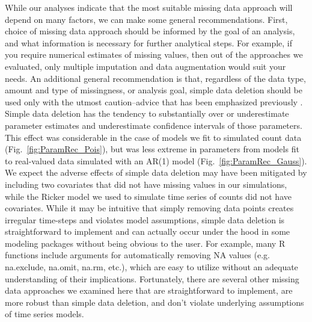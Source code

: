 \documentclass{article}
\begin{document}
While our analyses indicate that the most suitable missing data approach will depend on many factors, we can make some general recommendations. First, choice of missing data approach should be informed by the goal of an analysis, and what information is necessary for further analytical steps. For example, if you require numerical estimates of missing values, then out of the approaches we evaluated, only multiple imputation and data augmentation would suit your needs. An additional general recommendation is that, regardless of the data type, amount and type of missingness, or analysis goal, simple data deletion should be used only with the utmost caution--advice that has been emphasized previously \citep[e.g.,][]{nakagawa_model_2011, Shoari2018_mnar,lopucki2022handling}. Simple data deletion has the tendency to substantially over or underestimate parameter estimates and underestimate confidence intervals of those parameters. This effect was considerable in the case of models we fit to simulated count data (Fig.\ \ref{fig:ParamRec_Pois}), but was less extreme in parameters from models fit to real-valued data simulated with an AR(1) model (Fig.\ \ref{fig:ParamRec_Gauss}). We expect the adverse effects of simple data deletion may have been mitigated by including two covariates that did not have missing values in our simulations, while the Ricker model we used to simulate time series of counts did not have covariates. %
While it may be intuitive that simply removing data points creates irregular time-steps and violates model assumptions, simple data deletion is straightforward to implement and can actually occur under the hood in some modeling packages without being obvious to the user. For example, many R functions include arguments for automatically removing NA values (e.g. na.exclude, na.omit, na.rm, etc.), which are easy to utilize without an adequate understanding of their implications. Fortunately, there are several other missing data approaches we examined here that are straightforward to implement, are more robust than simple data deletion, and don't violate underlying assumptions of time series models.
\end{document}
